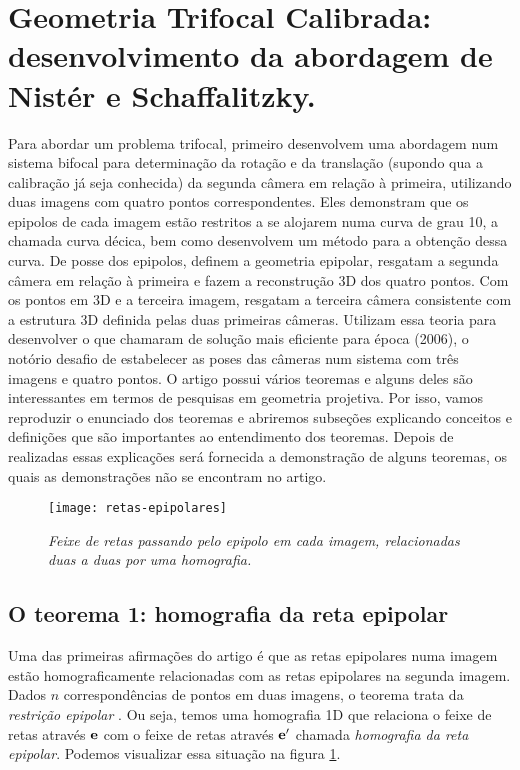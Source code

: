 \section{Geometria Trifocal Calibrada: desenvolvimento da abordagem de Nistér e Schaffalitzky.}\label{sec.nister}

Para abordar um problema trifocal, primeiro \cite{2503343} desenvolvem uma abordagem num sistema bifocal para determinação da rotação e da translação (supondo qua a calibração já seja conhecida) da segunda câmera em relação à primeira, utilizando duas imagens com quatro pontos correspondentes. Eles demonstram que os epipolos de cada imagem estão restritos a se alojarem numa curva de grau 10, a chamada curva décica, bem como desenvolvem um método para a obtenção dessa curva. De posse dos epipolos, definem a geometria epipolar, resgatam a segunda câmera em relação à primeira e fazem a reconstrução 3D dos quatro pontos. Com os pontos em 3D e a terceira imagem, resgatam a terceira câmera consistente com a estrutura 3D definida pelas duas primeiras câmeras. Utilizam essa teoria para desenvolver o que chamaram de solução mais eficiente para época (2006), o notório desafio de estabelecer as poses das câmeras num sistema com três imagens e quatro pontos. O artigo possui vários teoremas e alguns deles são interessantes em termos de pesquisas em geometria projetiva. Por isso, vamos reproduzir o enunciado dos teoremas e abriremos subseções explicando conceitos e definições que são importantes ao entendimento dos teoremas. Depois de realizadas essas explicações será fornecida a demonstração de alguns teoremas, os quais as demonstrações não se encontram no artigo.

\begin{figure}[!htb]
\centering
\texttt{[image: retas-epipolares]}
\caption{\textit{Feixe de retas passando pelo epipolo em cada imagem, relacionadas duas a duas por uma homografia.}}
\label{retas-epipolares}
\end{figure}

\subsection{O teorema 1: homografia da reta epipolar}\label{sec.homografia-reta-epipolar} 


Uma das primeiras afirmações do artigo é que as retas epipolares numa  imagem estão homograficamente relacionadas com as retas epipolares na segunda imagem. Dados $n$ correspondências de pontos em duas imagens, o teorema trata da \textit{restrição epipolar} \citep{faugeras93three}. Ou seja, temos uma homografia 1D que relaciona o feixe de retas através ${\bf e}$ com o feixe de retas através ${\bf e'}$ chamada \textit{homografia da reta epipolar}. Podemos visualizar essa situação na figura \ref{retas-epipolares}.

